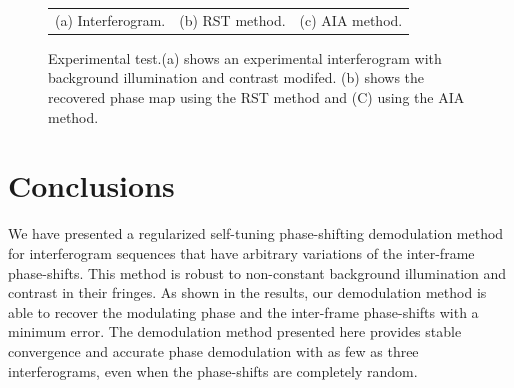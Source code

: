 \documentclass[letterpaper,12pt]{article}   %
\begin{document}
\begin{figure}[h t]
\begin{center}
\begin{tabular}{c c c}
			(a) Interferogram. &
			(b) RST method. &
			(c) AIA method.
		\end{tabular}
	\end{center}
	\caption{Experimental test.(a) shows an experimental interferogram with background 
	illumination and contrast modifed. (b) shows the recovered phase map using the RST 
	method and (C) using the AIA method.}
	\label{fig:ExpPhase}
\end{figure}


\section{Conclusions}

We have presented a regularized self-tuning phase-shifting demodulation method for 
interferogram sequences that have arbitrary variations of the inter-frame phase-shifts. 
This method is robust to non-constant background illumination and contrast in their 
fringes. As shown in the results, our demodulation method is able to recover the modulating 
phase and the inter-frame phase-shifts with a minimum error. The demodulation method 
presented here provides stable convergence and accurate phase demodulation with as few as 
three interferograms, even when the phase-shifts are completely random.



\end{document}
